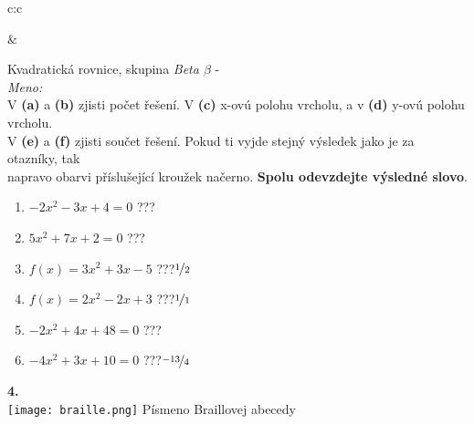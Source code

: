 \documentclass[10pt]{report}
\begin{document}
\begin{tabular}{c:c}
\begin{minipage}[c][99mm][t]{0.49\linewidth}
\begin{center}
\end{center}
\end{minipage}
&
\begin{minipage}[c][99mm][t]{0.49\linewidth}
\begin{center}
\vspace{7mm}
{\huge Kvadratická rovnice, skupina \textit{Beta $\beta$} -}\\[4.5mm]
\textit{Meno:}\phantom{xxxxxxxxxxxxxxxxxxxxxxxxxxxxxxxxxxxxxxxxxxxxxxxxxxxxxxxxxxxxxxxxx}\\[3.5mm]
V \textbf{(a)} a \textbf{(b)} zjisti počet řešení. V \textbf{(c)} x-ovú polohu vrcholu, a v \textbf{(d)} y-ovú polohu vrcholu.\\V \textbf{(e)} a \textbf{(f)} zjisti součet řešení. Pokud ti vyjde stejný výsledek jako je za otazníky, tak\\napravo obarvi příslušející kroužek načerno. \textbf{Spolu odevzdejte výsledné slovo}.\\[3mm]
\begin{minipage}{0.77\linewidth}
\begin{center}
\begin{varwidth}{\textwidth}
\begin{enumerate}
\large
\item $-2x^2-3x+4=0$\quad \dotfill\; ???\;\dotfill {}
\item $5x^2+7x+2=0$\quad \dotfill\; ???\;\dotfill {}
\item $f(x)=3x^2+3x-5$\quad \dotfill\; ???\;\dotfill \quad $\nicefrac{1}{2}$
\item $f(x)=2x^2-2x+3$\quad \dotfill\; ???\;\dotfill \quad $\nicefrac{1}{1}$
\item $-2x^2+4x+48=0$\quad \dotfill\; ???\;\dotfill {}
\item $-4x^2+3x+10=0$\quad \dotfill\; ???\;\dotfill \quad $\nicefrac{-13}{4}$
\end{enumerate}
\end{varwidth}
\end{center}
\end{minipage}
\begin{minipage}{0.20\linewidth}
\begin{center}
{\Huge\bfseries 4.} \\[2mm]
\texttt{[image: braille.png]}
{\small Písmeno Braillovej abecedy}
\end{center}
\end{minipage}
\end{center}
\end{minipage}

\end{tabular}
\end{document}
